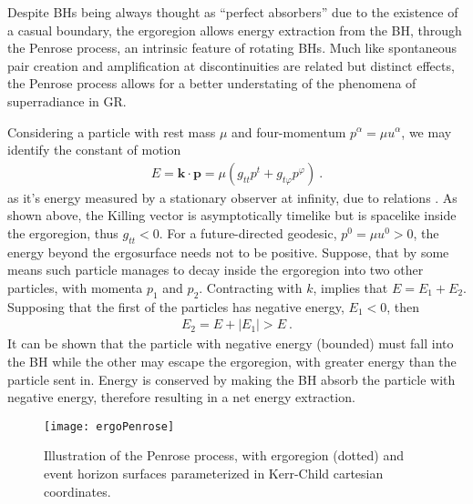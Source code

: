 Despite BHs being always thought as ``perfect absorbers'' due to the existence of a casual boundary, the ergoregion allows energy extraction from the BH, through the Penrose process, an intrinsic feature of rotating BHs.
Much like spontaneous pair creation and amplification at discontinuities are related but distinct effects, the Penrose process allows for a better understating of the phenomena of superradiance in GR. 

Considering a particle with rest mass $\mu$ and four-momentum $p^\alpha = \mu u^\alpha$, we may identify the constant of motion 
\begin{align}
    E = \bm{k} \cdot \bm{p} = \mu ( g_{tt} p^t + g_{t\varphi} p^\varphi ) ~.
    \label{eq2:PenroseE0}
\end{align}
as it's energy measured by a stationary observer at infinity, due to relations .
As shown above, the Killing vector is asymptotically timelike but is spacelike inside the ergoregion, thus $g_{tt}<0$.
For a future-directed geodesic, $p^0 = \mu u^0 > 0$, the energy beyond the ergosurface needs not to be positive.
Suppose, that by some means such particle manages to decay inside the ergoregion into two other particles, with momenta $p_1$ and $p_2$. Contracting with $k$, implies that $E = E_1+E_2$. Supposing that the first of the particles has negative energy, $E_1<0$, then 
\begin{align}
    E_2 = E + |E_1| > E ~.
    \label{eq2:PenroseE2}
\end{align}
It can be shown that the particle with negative energy (bounded) must fall into the BH while the other may escape the ergoregion, with greater energy than the particle sent in. 
Energy is conserved by making the BH absorb the particle with negative energy, therefore resulting in a net energy extraction.

\begin{figure}[h]
    \centering
    \vspace{0.2cm}
    \texttt{[image: ergoPenrose]}
    \caption{Illustration of the Penrose process, with ergoregion (dotted) and event horizon surfaces parameterized in Kerr-Child cartesian coordinates.}
    \label{fig2:penroseProcess}
\end{figure}

